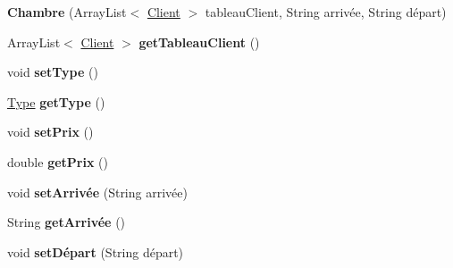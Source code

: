\begin{DoxyCompactItemize}
\item 
{\bfseries Chambre} (Array\+List$<$ \hyperlink{classclient_1_1_client}{Client} $>$ tableau\+Client, String arrivée, String départ)\hypertarget{classchambre_1_1_chambre_aa5fce4f89ec26914e9c893a46ef307a5}{}\label{classchambre_1_1_chambre_aa5fce4f89ec26914e9c893a46ef307a5}

\item 
Array\+List$<$ \hyperlink{classclient_1_1_client}{Client} $>$ {\bfseries get\+Tableau\+Client} ()\hypertarget{classchambre_1_1_chambre_a51bfdb856bbddf4a7560d47e3fce1d2c}{}\label{classchambre_1_1_chambre_a51bfdb856bbddf4a7560d47e3fce1d2c}

\item 
void {\bfseries set\+Type} ()\hypertarget{classchambre_1_1_chambre_a4adaa2f400c44659a2a3255ac73082f7}{}\label{classchambre_1_1_chambre_a4adaa2f400c44659a2a3255ac73082f7}

\item 
\hyperlink{enumchambre_1_1_chambre_1_1_type}{Type} {\bfseries get\+Type} ()\hypertarget{classchambre_1_1_chambre_a85a3796563b757947757ae361d9d54d3}{}\label{classchambre_1_1_chambre_a85a3796563b757947757ae361d9d54d3}

\item 
void {\bfseries set\+Prix} ()\hypertarget{classchambre_1_1_chambre_ab4ddf8eb213fd4c999947304e6a08afc}{}\label{classchambre_1_1_chambre_ab4ddf8eb213fd4c999947304e6a08afc}

\item 
double {\bfseries get\+Prix} ()\hypertarget{classchambre_1_1_chambre_a4abf51f9539b9cfebacce9e784950e1e}{}\label{classchambre_1_1_chambre_a4abf51f9539b9cfebacce9e784950e1e}

\item 
void {\bfseries set\+Arrivée} (String arrivée)\hypertarget{classchambre_1_1_chambre_a47b0ba3b56069c35371414a55ab694cc}{}\label{classchambre_1_1_chambre_a47b0ba3b56069c35371414a55ab694cc}

\item 
String {\bfseries get\+Arrivée} ()\hypertarget{classchambre_1_1_chambre_a22b4dd6da5c38dca2804397d9226afbc}{}\label{classchambre_1_1_chambre_a22b4dd6da5c38dca2804397d9226afbc}

\item 
void {\bfseries set\+Départ} (String départ)\hypertarget{classchambre_1_1_chambre_aae7c45ce7706478c6a567eea46d0b070}{}\label{classchambre_1_1_chambre_aae7c45ce7706478c6a567eea46d0b070}


\end{DoxyCompactItemize}
